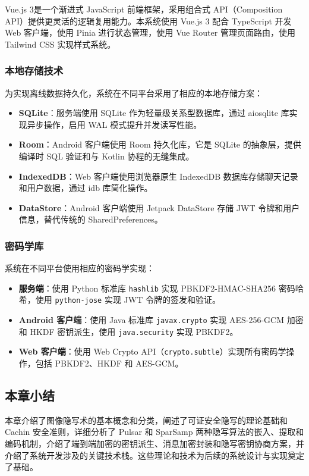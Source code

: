 Vue.js 3\supercite{vuejs}是一个渐进式 JavaScript 前端框架，采用组合式 API（Composition API）提供更灵活的逻辑复用能力。本系统使用 Vue.js 3 配合 TypeScript 开发 Web 客户端，使用 Pinia 进行状态管理，使用 Vue Router 管理页面路由，使用 Tailwind CSS 实现样式系统。

\subsubsection{本地存储技术}

为实现离线数据持久化，系统在不同平台采用了相应的本地存储方案：

\begin{itemize}
    \item \textbf{SQLite}：服务端使用 SQLite 作为轻量级关系型数据库，通过 aiosqlite 库实现异步操作，启用 WAL 模式提升并发读写性能。
    \item \textbf{Room}：Android 客户端使用 Room 持久化库，它是 SQLite 的抽象层，提供编译时 SQL 验证和与 Kotlin 协程的无缝集成。
    \item \textbf{IndexedDB}：Web 客户端使用浏览器原生 IndexedDB 数据库存储聊天记录和用户数据，通过 idb 库简化操作。
    \item \textbf{DataStore}：Android 客户端使用 Jetpack DataStore 存储 JWT 令牌和用户信息，替代传统的 SharedPreferences。
\end{itemize}

\subsubsection{密码学库}

系统在不同平台使用相应的密码学实现：

\begin{itemize}
    \item \textbf{服务端}：使用 Python 标准库 \texttt{hashlib} 实现 PBKDF2-HMAC-SHA256 密码哈希，使用 \texttt{python-jose} 实现 JWT 令牌的签发和验证。
    \item \textbf{Android 客户端}：使用 Java 标准库 \texttt{javax.crypto} 实现 AES-256-GCM 加密和 HKDF 密钥派生，使用 \texttt{java.security} 实现 PBKDF2。
    \item \textbf{Web 客户端}：使用 Web Crypto API（\texttt{crypto.subtle}）实现所有密码学操作，包括 PBKDF2、HKDF 和 AES-GCM。
\end{itemize}

\subsection{本章小结}

本章介绍了图像隐写术的基本概念和分类，阐述了可证安全隐写的理论基础和 Cachin 安全准则，详细分析了 Pulsar 和 SparSamp 两种隐写算法的嵌入、提取和编码机制，介绍了端到端加密的密钥派生、消息加密封装和隐写密钥协商方案，并介绍了系统开发涉及的关键技术栈。这些理论和技术为后续的系统设计与实现奠定了基础。
